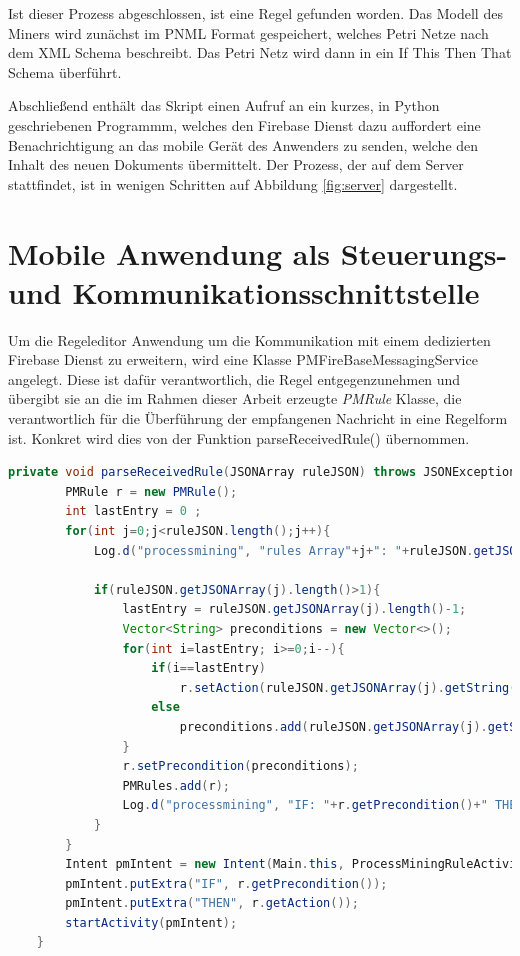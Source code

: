 Ist dieser Prozess abgeschlossen, ist eine Regel gefunden worden.
Das Modell des Miners wird zunächst im PNML Format gespeichert, welches Petri Netze nach dem XML Schema beschreibt. Das Petri Netz wird dann in ein If This Then That Schema überführt.

Abschließend enthält das Skript einen Aufruf an ein kurzes, in Python geschriebenen Programmm, welches den Firebase Dienst dazu auffordert eine Benachrichtigung an das mobile Gerät des Anwenders zu senden, welche den Inhalt des neuen Dokuments übermittelt. Der Prozess, der auf dem Server stattfindet, ist in wenigen Schritten auf Abbildung  \ref{fig:server} dargestellt.

\section{Mobile Anwendung als Steuerungs- und Kommunikationsschnittstelle}

Um die Regeleditor Anwendung um die Kommunikation mit einem dedizierten Firebase Dienst zu erweitern, wird eine Klasse PMFireBaseMessagingService angelegt. Diese ist dafür verantwortlich, die Regel entgegenzunehmen und übergibt sie an die im Rahmen dieser Arbeit erzeugte \textit{PMRule} Klasse, die verantwortlich für die Überführung der empfangenen Nachricht in eine Regelform ist. Konkret wird dies von der Funktion parseReceivedRule() übernommen.
\small
\begin{lstlisting}[language=Java]
       private void parseReceivedRule(JSONArray ruleJSON) throws JSONException {
        PMRule r = new PMRule();
        int lastEntry = 0 ;
        for(int j=0;j<ruleJSON.length();j++){
            Log.d("processmining", "rules Array"+j+": "+ruleJSON.getJSONArray(j));

            if(ruleJSON.getJSONArray(j).length()>1){
                lastEntry = ruleJSON.getJSONArray(j).length()-1;
                Vector<String> preconditions = new Vector<>();
                for(int i=lastEntry; i>=0;i--){
                    if(i==lastEntry)
                        r.setAction(ruleJSON.getJSONArray(j).getString(i));
                    else
                        preconditions.add(ruleJSON.getJSONArray(j).getString(i));
                }
                r.setPrecondition(preconditions);
                PMRules.add(r);
                Log.d("processmining", "IF: "+r.getPrecondition()+" THEN: "+r.getAction());
            }
        }
        Intent pmIntent = new Intent(Main.this, ProcessMiningRuleActivity.class);
        pmIntent.putExtra("IF", r.getPrecondition());
        pmIntent.putExtra("THEN", r.getAction());
        startActivity(pmIntent);
    }
\end{lstlisting}

